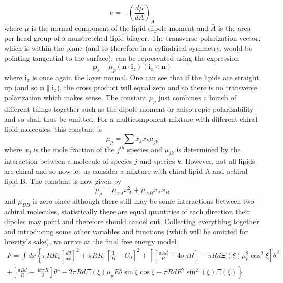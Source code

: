 \documentclass{article}
\newcommand{\od}[2]{\frac{d #1}{d #2}}
\newcommand{\vb}[1]{\mathbf{ #1}}
\numberwithin{equation}{section}
\begin{document}
\begin{equation}
    e= - \left( \od{\mu}{A} \right)_{\bar{A}}
\end{equation}
where $\mu$ is the normal component of the lipid dipole moment and $\bar{A}$ is the area per head group of a nonstretched lipid bilayer. The transverse polarization vector, which is within the plane (and so therefore in a cylindrical symmetry, would be pointing tangential to the surface), can be represented using the expression 
\begin{equation}
    \vb{p}_s - \mu_p(\vb{n} \cdot \vb{i}_z)(\vb{i}_z \times \vb{n})
\end{equation}
where $\vb{i}_z$ is once again the layer normal. One can see that if the lipids are straight up (and so $\vb{n} \parallel \vb{i}_z$), the cross product will equal zero and so there is no transverse polarization which makes sense. The constant $\mu_p$ just combines a bunch of different things together such as the dipole moment or anisotropic polarizability and so shall thus be omitted. For a multicomponent mixture with different chiral lipid molecules, this constant is 
\begin{equation}
    \mu_p = \sum x_j x_k\mu_{jk}
\end{equation}
where $x_j$ is the mole fraction of the $j^{th}$ species and $\mu_{jk}$ is determined by the interaction between a molecule of species $j$ and species $k$. However, not all lipids are chiral and so now let us consider a mixture with chiral lipid A and achiral lipid B. The constant is now given by 
\begin{equation}
    \mu_p = \mu_{AA}x^2_A+\mu_{AB}x_Ax_B
\end{equation}
and $\mu_{BB}$ is zero since although there still may be some interactions between two achiral molecules, statistically there are equal quantities of each direction their dipoles may point and therefore should cancel out. Collecting everything together and introducing some other variables and functions (which will be omitted for brevity's sake), we arrive at the final free energy model.
\begin{equation}
\begin{split}
    F = \int dx \left\{ \pi R K_b \left[ \frac{d\theta}{dx} \right]^2 + \pi R K_b \left[ \frac{1}{R} - C_0 \right]^2 + \left[ \left[ \frac{\pi A d}{R} + 4\sigma\pi R \right] - \pi R d \Xi(\xi) \mu_p^2 \cos^2\xi \right] \theta^2 \right. \\ \left.+ \left[ \frac{\pi B d}{R} - \frac{4\sigma\pi R}{3} \right] \theta^4  - 2\pi R d \Xi(\xi) \mu_p E \theta \sin\xi \cos\xi - \pi R d E^2 \sin^2(\xi) \Xi(\xi) \right\}  \label{eq:6.21}
\end{split}
\end{equation}
\end{document}
